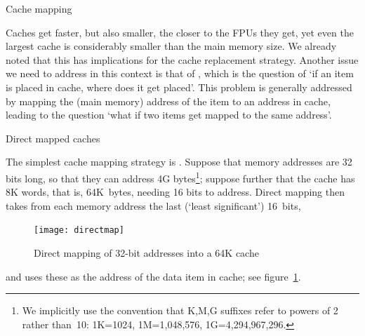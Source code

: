 
 {Cache mapping}

Caches get faster, but also smaller, the closer to the \acp{FPU} they
get, yet even the largest cache is considerably smaller than the main
memory size. We already noted that this has implications for the cache
replacement strategy. Another issue we need to address in this context
is that of , which is the question of `if
an item is placed in cache, where does it get placed'. This problem is
generally addressed by mapping the (main memory) address of the item
to an address in cache, leading to the question `what if two items get
mapped to the same address'.

 {Direct mapped caches}
\label{sec:directmap}

The simplest cache mapping strategy is . Suppose that memory addresses are 32 bits long, so that
they can address 4G bytes\footnote{We implicitly use the convention
  that K,M,G suffixes refer to powers of 2 rather than~10: 1K=1024,
  1M=1,048,576, 1G=4,294,967,296.}; suppose further that the
cache has 8K words, that is, 64K~bytes, needing 16 bits to address.
Direct mapping then takes from each memory address the last (`least
significant') 16~bits,
\begin{figure}
  \texttt{[image: directmap]}
  \caption{Direct mapping of 32-bit addresses into a 64K cache}
  \label{fig:directmap}
\end{figure}
and uses these as the address of the data item in cache; see figure~\ref{fig:directmap}.

